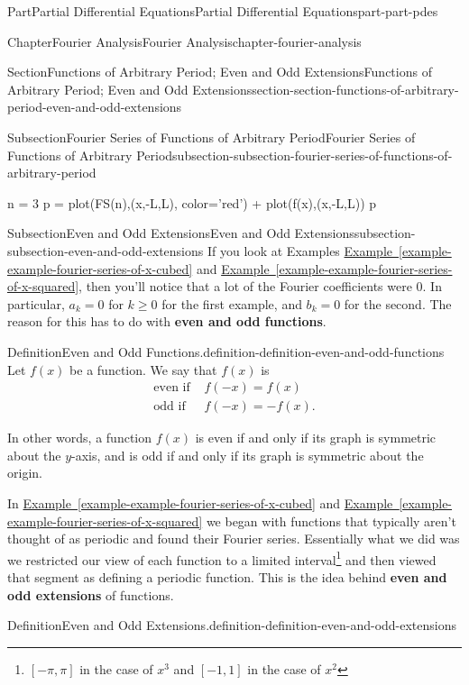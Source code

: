 \documentclass[twoside,10pt,]{book}
\newcommand{\xreffont}{\relax}
\newcommand{\terminology}[1]{\textbf{#1}}
\numberwithin{equation}{part}
\newcommand{\amp}{&}
\begin{document}
\begin{partptx}{Part}{Partial Differential Equations}{}{Partial Differential Equations}{}{}{part-part-pdes}
\begin{chapterptx}{Chapter}{Fourier Analysis}{}{Fourier Analysis}{}{}{chapter-fourier-analysis}
\begin{sectionptx}{Section}{Functions of Arbitrary Period; Even and Odd Extensions}{}{Functions of Arbitrary Period; Even and Odd Extensions}{}{}{section-section-functions-of-arbitrary-period-even-and-odd-extensions}
\begin{subsectionptx}{Subsection}{Fourier Series of Functions of Arbitrary Period}{}{Fourier Series of Functions of Arbitrary Period}{}{}{subsection-subsection-fourier-series-of-functions-of-arbitrary-period}
\begin{sageinput}
n = 3
p = plot(FS(n),(x,-L,L), color='red') + plot(f(x),(x,-L,L))
p
\end{sageinput}
\end{subsectionptx}
%
%
\typeout{************************************************}
\typeout{************************************************}
%
\begin{subsectionptx}{Subsection}{Even and Odd Extensions}{}{Even and Odd Extensions}{}{}{subsection-subsection-even-and-odd-extensions}
If you look at Examples \hyperref[example-example-fourier-series-of-x-cubed]{Example~{\xreffont\ref{example-example-fourier-series-of-x-cubed}}} and \hyperref[example-example-fourier-series-of-x-squared]{Example~{\xreffont\ref{example-example-fourier-series-of-x-squared}}}, then you'll notice that a lot of the Fourier coefficients were \(0\). In particular, \(a_{k} = 0\) for \(k\geq0\) for the first example, and \(b_{k}=0\) for the second. The reason for this has to do with \terminology{even and odd functions}.%
\begin{definition}{Definition}{Even and Odd Functions.}{definition-definition-even-and-odd-functions}%
%
Let \(f(x)\) be a function. We say that \(f(x)\) is%
\begin{align*}
\text{even if } \amp f(-x) = f(x)\\
\text{odd if } \amp f(-x) = -f(x).
\end{align*}
%
\end{definition}
In other words, a function \(f(x)\) is even if and only if its graph is symmetric about the \(y\)-axis, and is odd if and only if its graph is symmetric about the origin.%
\par
In \hyperref[example-example-fourier-series-of-x-cubed]{Example~{\xreffont\ref{example-example-fourier-series-of-x-cubed}}} and \hyperref[example-example-fourier-series-of-x-squared]{Example~{\xreffont\ref{example-example-fourier-series-of-x-squared}}} we began with functions that typically aren't thought of as periodic and found their Fourier series. Essentially what we did was we restricted our view of each function to a limited interval\footnote{\([-\pi,\pi]\) in the case of \(x^{3}\) and \([-1,1]\) in the case of \(x^{2}\)\label{fn-footnote-periodic-extensions}} and then viewed that segment as defining a periodic function. This is the idea behind \terminology{even and odd extensions} of functions.%
\begin{definition}{Definition}{Even and Odd Extensions.}{definition-definition-even-and-odd-extensions}%

\end{definition}
\end{subsectionptx}
\end{sectionptx}
\end{chapterptx}
\end{partptx}
\end{document}
